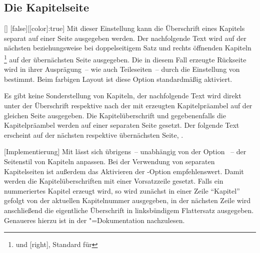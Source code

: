 \subsection{Die Kapitelseite}
\begin{Declaration}{[\PBoolean]}%
  [false][[color]:true]%
\printdeclarationlist%
\label{sec:chapter}%
%
%
%
Mit dieser Einstellung kann die Überschrift eines Kapitels separat auf einer 
Seite ausgegeben werden. Der nachfolgende Text wird auf der nächsten 
beziehungsweise bei doppelseitigem Satz und rechts öffnenden Kapiteln%
\footnote{%
   und [right], Standard für 
}
auf der übernächsten Seite ausgegeben. Die in diesem Fall erzeugte Rückseite 
wird in ihrer Ausprägung~-- wie auch Teileseiten~-- durch die Einstellung von 
 bestimmt. Beim farbigen Layout ist diese Option 
standardmäßig aktiviert. \notudscrartcl
%
\begin{values}
\itemfalse
  Es gibt keine Sonderstellung von Kapiteln, der nachfolgende Text wird direkt 
  unter der Überschrift respektive nach der mit  
  erzeugten Kapitelpräambel auf der gleichen Seite ausgegeben.
\itemtrue*
  Die Kapitelüberschrift und gegebenenfalls die Kapitelpräambel werden auf 
  einer separaten Seite gesetzt. Der folgende Text erscheint auf der nächsten   
  respektive übernächsten Seite, .
\end{values}
%
[Implementierung]
Mit %
 lässt sich übrigens~-- unabhängig von der Option 
~-- der Seitenstil von Kapiteln anpassen. Bei der 
Verwendung von separaten Kapitelseiten ist außerdem das Aktivieren der 
\KOMAScript-Option  empfehlenswert. Damit werden die
Kapitelüberschriften mit einer Vorsatzzeile gesetzt. Falls ein nummeriertes 
Kapitel erzeugt wird, so wird zunächst in einer Zeile \enquote{Kapitel} gefolgt 
von der aktuellen Kapitelnummer ausgegeben, in der nächsten Zeile wird 
anschließend die eigentliche Überschrift in linksbündigem Flattersatz 
ausgegeben. Genaueres hierzu ist in der \KOMAScript"=Dokumentation 
nachzulesen.
\end{Declaration}


